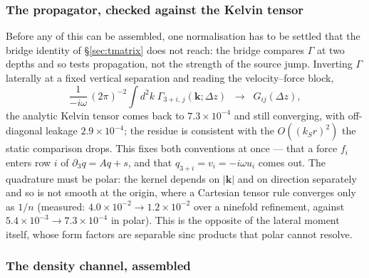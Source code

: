 \documentclass[11pt,a4paper]{article}
\begin{document}
\subsubsection*{The propagator, checked against the Kelvin tensor}

Before any of this can be assembled, one normalisation has to be settled that the
bridge identity of \S\ref{sec:tmatrix} does not reach: the bridge compares
$\Gamma$ at two depths and so tests propagation, not the strength of the source
jump.  Inverting $\Gamma$ laterally at a fixed vertical separation and reading
the velocity--force block,
\begin{equation}
  \frac{1}{-i\omega}\,(2\pi)^{-2}\!\!\int\! d^2k\;
  \Gamma_{3+i,\,j}(\mathbf{k};\Delta z)
  \;\;\longrightarrow\;\; G_{ij}(\Delta z),
\end{equation}
the analytic Kelvin tensor comes back to $7.3\times10^{-4}$ and still
converging, with off-diagonal leakage $2.9\times10^{-4}$; the residue is
consistent with the $O((k_S r)^2)$ the static comparison drops.  This fixes both
conventions at once --- that a force $f_i$ enters row $i$ of
$\partial_3 q = Aq + s$, and that $q_{3+i} = v_i = -i\omega u_i$ comes out.  The
quadrature must be polar: the kernel depends on $|\mathbf{k}|$ and on direction
separately and so is not smooth at the origin, where a Cartesian tensor rule
converges only as $1/n$ (measured: $4.0\times10^{-2} \to 1.2\times10^{-2}$ over
a ninefold refinement, against $5.4\times10^{-3} \to 7.3\times10^{-4}$ in
polar).  This is the opposite of the lateral moment itself, whose form factors
are separable sinc products that polar cannot resolve.

\subsubsection*{The density channel, assembled}
\end{document}
